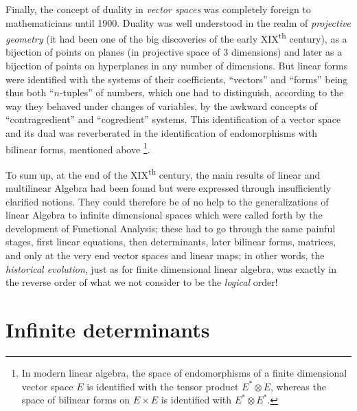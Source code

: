 \documentclass[12pt,a4paper,leqno,twoside]{extbook}
\newcommand{\supth}{\texorpdfstring{\textsuperscript{th}}{th}}
\begin{document}
Finally, the concept of duality in \emph{vector spaces} was completely foreign to mathematicians until 1900. Duality was well understood in the realm of \emph{projective geometry} (it had been one of the big discoveries of the early XIX\supth{} century), as a bijection of points on planes (in projective space of 3 dimensions) and later as a bijection of points on hyperplanes in any number of dimensions. But linear forms were identified with the systems of their coefficients, ``vectors'' and ``forms'' being thus both ``\(n\)-tuples'' of numbers, which one had to distinguish, according to the way they behaved under changes of variables, by the awkward concepts of ``contragredient'' and ``cogredient'' systems. This identification of a vector space and its dual was reverberated in the identification of endomorphisms with bilinear forms, mentioned above \footnote{In modern linear algebra, the space of endomorphisms of a finite dimensional vector space \(E\) is identified with the tensor product \(E^* \otimes E\), whereas the space of bilinear forms on \(E \times E\) is identified with \(E^* \otimes E^*\).}.

To sum up, at the end of the XIX\supth{} century, the main results of linear and multilinear Algebra had been found but were expressed through insufficiently clarified notions. They could therefore be of no help to the generalizations of linear Algebra to infinite dimensional spaces which were called forth by the development of Functional Analysis; these had to go through the same painful stages, first linear equations, then determinants, later bilinear forms, matrices, and only at the very end vector spaces and linear maps; in other words, the \emph{historical evolution}, just as for finite dimensional linear algebra, was exactly in the reverse order of what we not consider to be the \emph{logical} order!

\section{Infinite determinants}
\label{sec:4.2}
\end{document}
